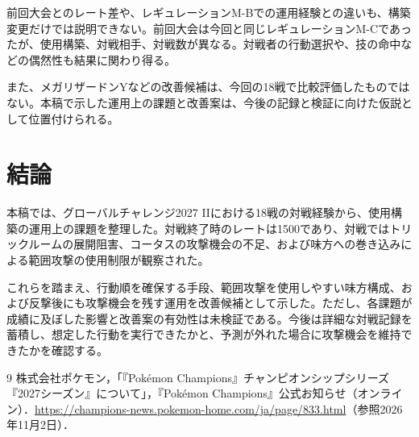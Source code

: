 \documentclass[a4paper,10pt]{ltjsarticle}
\begin{document}
前回大会とのレート差や、レギュレーションM-Bでの運用経験との違いも、構築変更だけでは説明できない。前回大会は今回と同じレギュレーションM-Cであったが、使用構築、対戦相手、対戦数が異なる。対戦者の行動選択や、技の命中などの偶然性も結果に関わり得る。

また、メガリザードンYなどの改善候補は、今回の18戦で比較評価したものではない。本稿で示した運用上の課題と改善案は、今後の記録と検証に向けた仮説として位置付けられる。

\section{結論}

本稿では、グローバルチャレンジ2027 IIにおける18戦の対戦経験から、使用構築の運用上の課題を整理した。対戦終了時のレートは1500であり、対戦ではトリックルームの展開阻害、コータスの攻撃機会の不足、および味方への巻き込みによる範囲攻撃の使用制限が観察された。

これらを踏まえ、行動順を確保する手段、範囲攻撃を使用しやすい味方構成、および反撃後にも攻撃機会を残す運用を改善候補として示した。ただし、各課題が成績に及ぼした影響と改善案の有効性は未検証である。今後は詳細な対戦記録を蓄積し、想定した行動を実行できたかと、予測が外れた場合に攻撃機会を維持できたかを確認する。

\begin{thebibliography}{9}
 株式会社ポケモン，「『Pokémon Champions』チャンピオンシップシリーズ『2027シーズン』について」，『Pokémon Champions』公式お知らせ（オンライン）．\url{https://champions-news.pokemon-home.com/ja/page/833.html}（参照2026年11月2日）．
\end{thebibliography}
\end{document}
